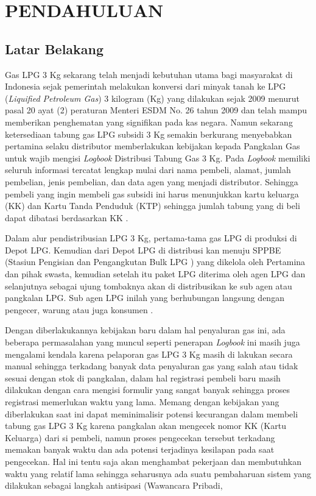 
\chapter{PENDAHULUAN}

\section{Latar Belakang}
Gas LPG 3 Kg sekarang telah menjadi kebutuhan utama bagi masyarakat di Indonesia sejak pemerintah melakukan konversi dari minyak tanah ke LPG (\textit{Liquified Petroleum Gas}) 3 kilogram (Kg) yang dilakukan sejak 2009 menurut pasal 20 ayat (2) peraturan Menteri ESDM No. 26 tahun 2009 dan telah mampu memberikan penghematan yang signifikan pada kas negara. Namun sekarang ketersediaan tabung gas LPG subsidi 3 Kg semakin berkurang menyebabkan pertamina selaku distributor memberlakukan kebijakan kepada Pangkalan Gas untuk wajib mengisi \textit{Logbook} Distribusi Tabung Gas 3 Kg. Pada \textit{Logbook} memiliki seluruh informasi tercatat lengkap mulai dari nama pembeli, alamat, jumlah pembelian, jenis pembelian, dan data agen yang menjadi distributor. Sehingga  pembeli yang ingin membeli gas subsidi ini harus menunjukkan kartu keluarga (KK) dan Kartu Tanda Penduduk (KTP) sehingga jumlah tabung yang di beli dapat dibatasi berdasarkan KK \citep{antaraRiau}.
\par Dalam alur pendistribusian LPG 3 Kg, pertama-tama gas LPG di produksi di Depot LPG. Kemudian dari Depot LPG di distribusi kan menuju SPPBE (Stasiun Pengisian dan Pengangkutan Bulk LPG ) yang dikelola oleh Pertamina dan pihak swasta, kemudian setelah itu paket LPG diterima oleh agen LPG dan selanjutnya sebagai ujung tombaknya akan di distribusikan ke sub agen atau pangkalan LPG. Sub agen LPG inilah yang berhubungan langsung dengan pengecer, warung atau juga konsumen \citep{alurLPG}.
\par Dengan diberlakukannya kebijakan baru dalam hal penyaluran gas ini, ada beberapa permasalahan yang muncul seperti penerapan \textit{Logbook} ini masih juga mengalami kendala karena pelaporan gas LPG 3 Kg masih di lakukan secara manual sehingga terkadang banyak data penyaluran gas yang salah atau tidak sesuai dengan stok di pangkalan, dalam hal registrasi pembeli baru masih dilakukan dengan cara mengisi formulir yang sangat banyak sehingga proses registrasi memerlukan waktu yang lama. Memang dengan kebijakan yang diberlakukan saat ini dapat meminimalisir potensi kecurangan dalam membeli tabung gas LPG 3 Kg karena pangkalan akan mengecek nomor KK (Kartu Keluarga) dari si pembeli, namun proses pengecekan tersebut terkadang memakan banyak waktu dan ada potensi terjadinya kesilapan pada saat pengecekan.  Hal ini tentu saja akan menghambat pekerjaan dan membutuhkan waktu yang relatif lama sehingga seharusnya ada suatu pembaharuan sistem yang dilakukan sebagai langkah antisipasi (Wawancara Pribadi,
